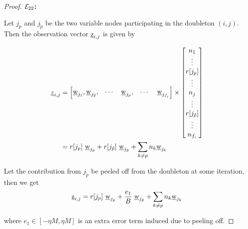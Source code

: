 \begin{proof}

{\bf $\mathcal{E}_{22}$:}

Let $j_p$ and $j_{\tilde{p}}$ be the two variable nodes participating in the doubleton $(i,j)$. Then the observation vector $\underline{\mathrm{z}}_{i,j}$ is given by 

\begin{align*}
\underline{z}_{i,j} &= \begin{bmatrix}
\wv_{j_{1}},\wv_{j_2}, & \cdots   & \wv_{j_p}, &\cdots \ &\wv_{j_{f_i}}
\end{bmatrix} \times
\begin{bmatrix}
n_{1} \\
\vdots \\
r[j_p]\\
\vdots\\
n_{j} \\
\vdots\\
r[j_{\tilde{p}}]\\
\vdots\\
n_{f_i}\\
\end{bmatrix}\\
&= r[j_p] ~ \wv_{j_p} + r[j_{\tilde{p}}] ~ \wv_{j_{\tilde{p}}} + \sum_{k \neq p}n_k \wv_{j_k} \\
\end{align*}

Let the contribution from $j_{\tilde{p}}$ be peeled off from the doubleton at some iteration, then we get
\[ \underline{\mathrm{z}}_{i,j} = r[j_p] ~ \underline{\mathrm{w}}_{j_p} + \frac{e_1}{B} ~ \underline{\mathrm{w}}_{j_{\tilde{p}}} + \sum_{k \neq p}n_k \underline{\mathrm{w}}_{j_k}\]

where $e_1 \in[-\eta M, \eta M]$ is an extra error term induced due to peeling off.


\end{proof}
